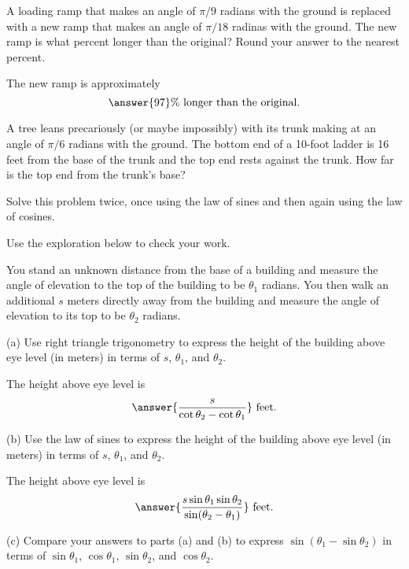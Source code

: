 \documentclass{ximera}
\begin{document}
\begin{question} \label{Q0:SineCosine}
A loading ramp that makes an angle of $\pi/9$ radians with the ground is replaced with a new ramp that makes an angle of $\pi/18$ radinas with the ground. The new ramp is what percent longer than the original? Round your answer to the nearest percent.

The new ramp is approximately 
\[
   \answer{97}\% \text{ longer than the original.}
\]


\end{question}


\begin{question} \label{Q00:SineCosine}
A tree leans precariously (or maybe impossibly) with its trunk making at an angle of $\pi/6$ radians with the ground. The bottom end of a 10-foot ladder is 16 feet from the base of the trunk and the top end rests against the trunk. How far is the top end from the trunk's base? 

Solve this problem twice, once using the law of sines and then again using the law of cosines.

Use the exploration below to check your work.

\begin{exploration}

 
\begin{onlineOnly}
    \begin{center}
\end{center}
\end{onlineOnly}
\end{exploration} 

\end{question}


\begin{question} \label{Q1:SineCosine}
You stand an unknown distance from the base of a building and measure the angle of elevation to the top of the building to be $\theta_1$ radians. You then walk an additional $s$ meters directly away from the building and measure the angle of elevation to its top to be $\theta_2$ radians. 

(a) Use right triangle trigonometry to express the height of the building above eye level (in meters) in terms of $s$, $\theta_1$, and $\theta_2$.


The height above eye level is 
\[
       \answer{\frac{s}{\cot\theta_2-\cot \theta_1}} \text{ feet}.
\]

(b) Use the law of sines to express the height of the building above eye level (in meters) in terms of $s$, $\theta_1$, and $\theta_2$.

The height above eye level is 
\[
       \answer{\frac{s \sin \theta_1 \sin\theta_2}{\sin(\theta_2-\theta_1)}} \text{ feet}.
\]

(c) Compare your answers to parts (a) and (b) to express $\sin(\theta_1 - \sin\theta_2)$ in terms of $\sin\theta_1$, $\cos\theta_1$, $\sin\theta_2$, and $\cos\theta_2$.

\end{question}
\end{document}
